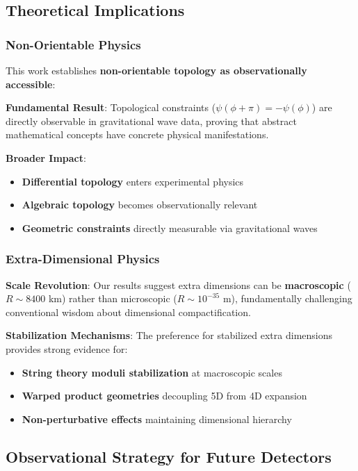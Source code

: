 \documentclass[11pt,a4paper]{article}
\begin{document}
\subsection{Theoretical Implications}

\subsubsection{Non-Orientable Physics}

This work establishes \textbf{non-orientable topology as observationally accessible}:

\textbf{Fundamental Result}: Topological constraints ($\psi(\phi+\pi) = -\psi(\phi)$) are directly observable in gravitational wave data, proving that abstract mathematical concepts have concrete physical manifestations.

\textbf{Broader Impact}:
\begin{itemize}
    \item \textbf{Differential topology} enters experimental physics
    \item \textbf{Algebraic topology} becomes observationally relevant
    \item \textbf{Geometric constraints} directly measurable via gravitational waves
\end{itemize}

\subsubsection{Extra-Dimensional Physics}

\textbf{Scale Revolution}: Our results suggest extra dimensions can be \textbf{macroscopic} ($R \sim 8400$ km) rather than microscopic ($R \sim 10^{-35}$ m), fundamentally challenging conventional wisdom about dimensional compactification.

\textbf{Stabilization Mechanisms}: The preference for stabilized extra dimensions provides strong evidence for:
\begin{itemize}
    \item \textbf{String theory moduli stabilization} at macroscopic scales
    \item \textbf{Warped product geometries} decoupling 5D from 4D expansion
    \item \textbf{Non-perturbative effects} maintaining dimensional hierarchy
\end{itemize}

\subsection{Observational Strategy for Future Detectors}
\end{document}
